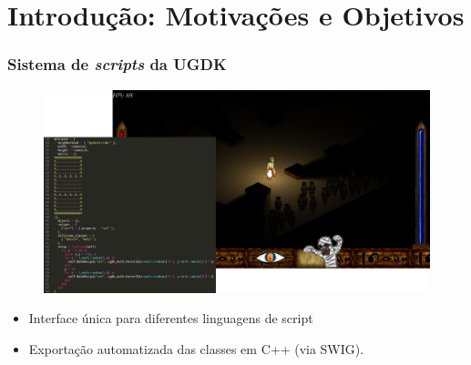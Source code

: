 \documentclass[brazil]{beamer}
\begin{document}
\section{Introdução: Motivações e Objetivos}
\begin{frame}[fragile]
  \frametitle{Sistema de \textit{scripts} da UGDK}
  \pause
  \begin{figure}
    \includegraphics[width=.8\textwidth]{images/horus+sublime.png}
  \end{figure}
  \vspace{-10pt}
  \begin{itemize}
    \pause
    \item Interface única para diferentes linguagens de script
    \pause
    \item Exportação automatizada das classes em C++ (via SWIG).
  \end{itemize}
\end{frame}
\end{document}
